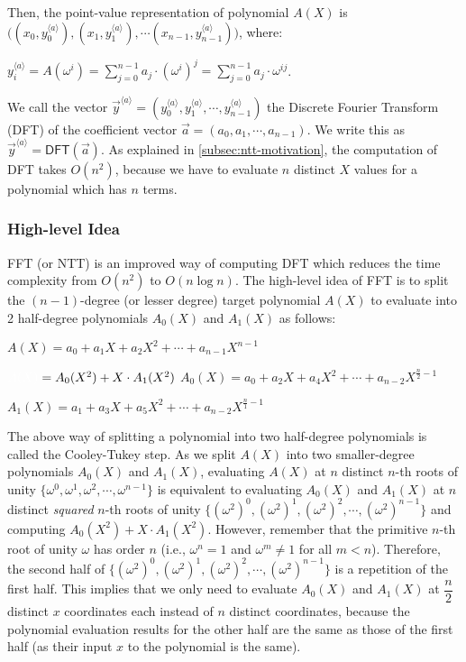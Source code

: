 Then, the point-value representation of polynomial $A(X)$ is $\bm ( ({x}_0, {y}_0^{\langle a \rangle}), ({x}_1, {y}_1^{\langle a \rangle}), \cdots ({x}_{n-1}, {y}_{n-1}^{\langle a \rangle}) \bm )$, where: 

${y}_i^{\langle a \rangle} = A(\omega^i) = \sum\limits_{j=0}^{n-1}a_{j}\cdot (\omega^i)^j = \sum\limits_{j=0}^{n-1}a_{j}\cdot \omega^{ij}$. 

We call the vector $\vec{y}^{\langle a \rangle} = (y_0^{\langle a \rangle}, y_1^{\langle a \rangle}, \cdots, y_{n-1}^{\langle a \rangle})$ the Discrete Fourier Transform (DFT) of the coefficient vector $\vec{a} = (a_0, a_1, \cdots, a_{n-1})$. We write this as $\vec{y}^{\langle a \rangle} = \textsf{DFT}(\vec{a})$. As explained in \autoref{subsec:ntt-motivation}, the computation of DFT takes $O(n^2)$, because we have to evaluate $n$ distinct $X$ values for a polynomial which has $n$ terms.

\subsubsection{High-level Idea}
\label{subsec:ntt-forward-overview}

FFT (or NTT) is an improved way of computing DFT which reduces the time complexity from $O(n^2)$ to $O(n \log n)$. The high-level idea of FFT is to split the $(n-1)$-degree (or lesser degree) target polynomial $A(X)$ to evaluate into 2 half-degree polynomials $A_0(X)$ and $A_1(X)$ as follows:


$A(X) = a_0 + a_1X + a_2X^2 + \cdots + a_{n-1}X^{n - 1}$

$\textcolor{white}{A(X) }= A_0(X^2) + X \cdot A_1(X^2)$
$A_0(X) = a_0 + a_2X + a_4X^2 + \cdots + a_{n-2}X^{\frac{n}{2} - 1}$

$A_1(X) = a_1 + a_3X + a_5X^2 + \cdots + a_{n-2}X^{\frac{n}{1} - 1}$

The above way of splitting a polynomial into two half-degree polynomials is called the Cooley-Tukey step. As we split $A(X)$ into two smaller-degree polynomials $A_0(X)$ and $A_1(X)$, evaluating $A(X)$ at $n$ distinct $n$-th roots of unity $\{\omega^0, \omega^1, \omega^2, \cdots, \omega^{n-1}\}$ is equivalent to evaluating $A_0(X)$ and $A_1(X)$ at $n$ distinct \textit{squared} $n$-th roots of unity $\{(\omega^2)^0, (\omega^2)^1, (\omega^2)^2, \cdots, (\omega^2)^{n-1}\}$ and computing $A_0(X^2) + X\cdot A_1(X^2)$. However, remember that the primitive $n$-th root of unity $\omega$ has order $n$ (i.e., $\omega^n = 1$ and $\omega^m \neq 1$ for all $m < n$). Therefore, the second half of $\{(\omega^2)^0, (\omega^2)^1, (\omega^2)^2, \cdots, (\omega^2)^{n-1}\}$ is a repetition of the first half. This implies that we only need to evaluate $A_0(X)$ and $A_1(X)$ at $\dfrac{n}{2}$ distinct $x$ coordinates each instead of $n$ distinct coordinates, because the polynomial evaluation results for the other half are the same as those of the first half (as their input $x$ to the polynomial is the same). 

